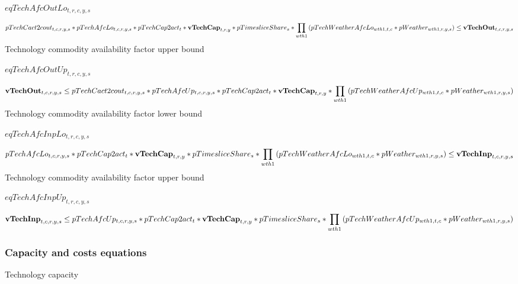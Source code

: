 \documentclass{article}
\begin{document}
$eqTechAfcOutLo_{t,r,c,y,s}$





\begin{dmath}
pTechCact2cout_{t,c,r,y,s}*pTechAfcLo_{t,c,r,y,s}*pTechCap2act_{t}*{\bf vTechCap}_{t,r,y}*pTimesliceShare_{s}*\prod_{wth1}{\left(pTechWeatherAfcLo_{wth1,t,c}*pWeather_{wth1,r,y,s}\right)}  \le  {\bf vTechOut}_{t,c,r,y,s}
\end{dmath}
Technology commodity availability factor upper bound







$eqTechAfcOutUp_{t,r,c,y,s}$





\begin{dmath}
{\bf vTechOut}_{t,c,r,y,s}  \le  pTechCact2cout_{t,c,r,y,s}*pTechAfcUp_{t,c,r,y,s}*pTechCap2act_{t}*{\bf vTechCap}_{t,r,y}*\prod_{wth1}{\left(pTechWeatherAfcUp_{wth1,t,c}*pWeather_{wth1,r,y,s}\right)}
\end{dmath}
Technology commodity availability factor lower bound







$eqTechAfcInpLo_{t,r,c,y,s}$





\begin{dmath}
pTechAfcLo_{t,c,r,y,s}*pTechCap2act_{t}*{\bf vTechCap}_{t,r,y}*pTimesliceShare_{s}*\prod_{wth1}{\left(pTechWeatherAfcLo_{wth1,t,c}*pWeather_{wth1,r,y,s}\right)}  \le  {\bf vTechInp}_{t,c,r,y,s}
\end{dmath}
Technology commodity availability factor upper bound







$eqTechAfcInpUp_{t,r,c,y,s}$





\begin{dmath}
{\bf vTechInp}_{t,c,r,y,s}  \le  pTechAfcUp_{t,c,r,y,s}*pTechCap2act_{t}*{\bf vTechCap}_{t,r,y}*pTimesliceShare_{s}*\prod_{wth1}{\left(pTechWeatherAfcUp_{wth1,t,c}*pWeather_{wth1,r,y,s}\right)}
\end{dmath}
\subsubsection*{Capacity and costs equations}
Technology capacity
\end{document}
